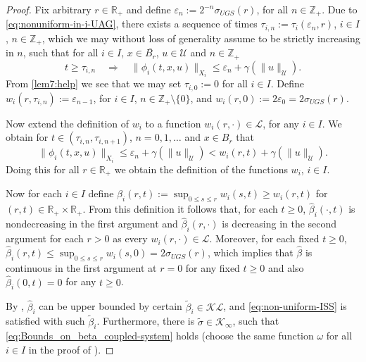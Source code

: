 \documentclass[twocolumn]{IEEEtran} %
\theoremstyle{definition}
\newtheorem{remark}[theorem]{Remark}
\newcommand{\Uc}{\mathcal{U}}%
\newcommand{\R}{\mathbb{R}}%
\newcommand{\Kinf}{\mathcal{K_\infty}}%
\newcommand{\KL}{\mathcal{KL}}%
\newcommand{\LL}{\mathcal{L}}%
\newcommand{\N}{\mathbb{N}}%
\newcommand{\Z}{\mathbb{Z}}%
\newcommand{\T}{\ensuremath{\mathcal{T}}}  %
\newcommand \qrq   {\quad\Rightarrow\quad}
\newcommand \eps {\varepsilon}
\begin{document}
\begin{proof}

Fix arbitrary $r \in \R_+$ and define $\eps_n:= 2^{-n}  \sigma_{UGS}(r)$, for all $n \in \Z_+$. Due to \eqref{eq:nonuniform-in-i-UAG}, there exists a sequence of times
$\tau_{i,n}:=\tau_i(\eps_n,r)$, $i\in I$, $n\in\Z_+$, which we may without loss of generality assume
to be strictly increasing in $n$, such that for all $i\in I$, $x \in \overline{B_r}$, $u \in \Uc$ and $n\in\Z_+$
\[
t \geq \tau_{i,n} \qrq \|\phi_i(t,x,u)\|_{X_i} \leq \eps_n + \gamma(\|u\|_{\Uc}).
\]
From \eqref{lem7:help} we see that we may set $\tau_{i,0} := 0$ for all $i\in I$.
Define $w_i(r,\tau_{i,n}):=\eps_{n-1}$, for $i\in I$, $n \in \Z_+\setminus\{0\}$, and $w_i(r,0):=2\eps_0=2\sigma_{UGS}(r)$.

Now extend the definition of $w_i$ 
to a function
$w_i(r,\cdot) \in \LL$, for any $i\in I$. 
We obtain for $t \in (\tau_{i,n},\tau_{i,n+1})$, $n=0,1,\ldots$ and $x\in B_r$
that
\[
\|\phi_i(t,x,u)\|_{X_i} \leq \eps_n + \gamma(\|u\|_{\Uc})< w_i(r,t) + \gamma(\|u\|_{\Uc}).
\]
Doing this for all $r \in \R_+$ we obtain the definition of the functions $w_i$, $i\in I$.

Now for each $i\in I$ define $\hat \beta_i(r,t):=\sup_{0 \leq s \leq r}w_i(s,t) \geq
w_i(r,t)$ for $(r,t) \in \R_+ \times \R_+$. From this definition it follows that, 
for each $t\geq 0$, $\hat\beta_i(\cdot,t)$ is 
nondecreasing in the first argument and $\hat\beta_i(r,\cdot)$ is decreasing in the second argument for each $r>0$ as
every $w_i(r,\cdot) \in \LL$.
Moreover, for each fixed $t\geq0$, $\hat \beta_i(r,t) \leq \sup_{0 \leq s \leq r}w_i(s,0)=2\sigma_{UGS}(r)$, which implies that $\hat\beta$ is continuous in the first argument at $r=0$ for any fixed $t\geq0$ and also $\hat \beta_i(0,t)=0$ for any $t\geq 0$.

By \cite[Proposition 9]{MiW19b}, $\hat\beta_i$ can be upper bounded by certain $\tilde{\beta}_i\in \KL$, and 
\eqref{eq:non-uniform-ISS} is satisfied with such $\tilde{\beta}_i$.
Furthermore, there is $\tilde{\sigma}\in\Kinf$, such that \eqref{eq:Bounds_on_beta_coupled-system} holds (choose the same function $\omega$ for all $i\in I$ in the proof of \cite[Proposition 9]{MiW19b}). 
\end{proof}

%
\end{document}
